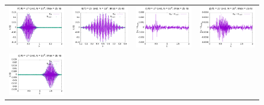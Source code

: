 \documentclass[11pt,a4paper]{report}
\begin{document}
\begin{figure}
\begin{tabular}{cccc}
\includegraphics[width=45mm]{plots/27/mc27_3_25} & 
\includegraphics[width=45mm]{plots/27/closeup/mc27_3_25} &      \includegraphics[width=45mm]{plots/27/mc27_3_25_dif} &   \includegraphics[width=45mm]{plots/27/mc27_5_25_dif} \\
\includegraphics[width=45mm]{plots/27/mc27_3_35} &   

\end{tabular}
\end{figure}
\end{document}
